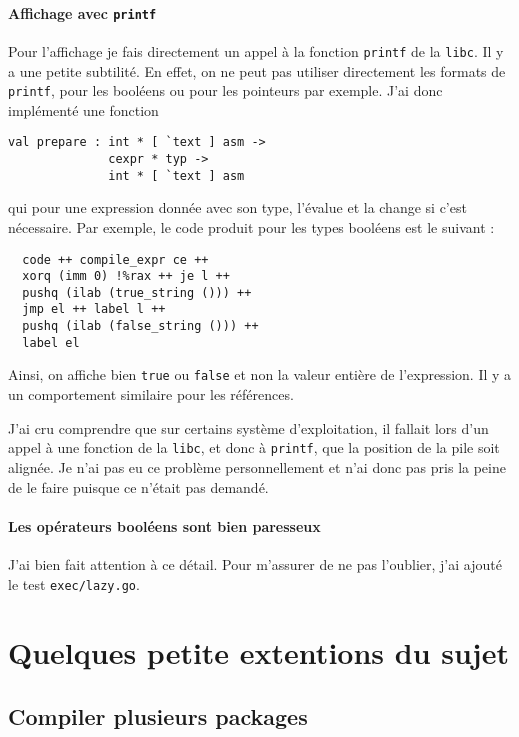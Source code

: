 \documentclass[11pt]{article}
\begin{document}
\paragraph{Affichage avec \texttt{printf}}

Pour l'affichage je fais directement un appel à la fonction \texttt{printf} de la \texttt{libc}. Il y a une petite subtilité. En effet, on ne peut pas utiliser directement les formats de \texttt{printf}, pour les booléens ou pour les pointeurs par exemple. J'ai donc implémenté une fonction

\begin{verbatim}
val prepare : int * [ `text ] asm ->
              cexpr * typ ->
              int * [ `text ] asm
\end{verbatim}

qui pour une expression donnée avec son type, l'évalue et la change si c'est nécessaire. Par exemple, le code produit pour les types booléens est le suivant :

\begin{verbatim}
  code ++ compile_expr ce ++
  xorq (imm 0) !%rax ++ je l ++
  pushq (ilab (true_string ())) ++
  jmp el ++ label l ++
  pushq (ilab (false_string ())) ++
  label el
\end{verbatim}

Ainsi, on affiche bien \texttt{true} ou \texttt{false} et non la valeur entière de l'expression. Il y a un comportement similaire pour les références.

J'ai cru comprendre que sur certains système d'exploitation, il fallait lors d'un appel à une fonction de la \texttt{libc}, et donc à \texttt{printf}, que la position de la pile soit alignée. Je n'ai pas eu ce problème personnellement et n'ai donc pas pris la peine de le faire puisque ce n'était pas demandé.

\paragraph{Les opérateurs booléens sont bien paresseux} J'ai bien fait attention à ce détail. Pour m'assurer de ne pas l'oublier, j'ai ajouté le test \texttt{exec/lazy.go}.

\section{Quelques petite extentions du sujet\label{sec:ext}}

\subsection{Compiler plusieurs packages\label{sec:pkg}}
\end{document}
